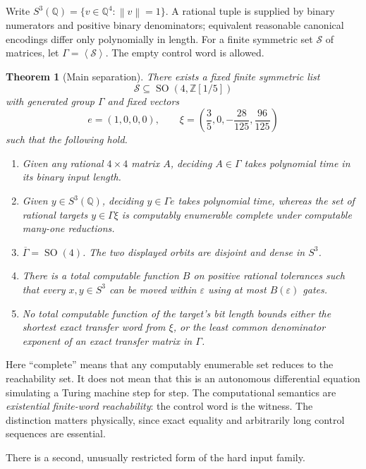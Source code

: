 \documentclass[11pt,letterpaper]{article}
\numberwithin{equation}{section}
\newtheorem{theorem}{Theorem}[section]
\theoremstyle{definition}
\theoremstyle{remark}
\newcommand{\Z}{\mathbb Z}
\newcommand{\Q}{\mathbb Q}
\newcommand{\eps}{\varepsilon}
\newcommand{\Sphere}{S^3}
\newcommand{\SO}{\operatorname{SO}}
\newcommand{\pair}[1]{\left\langle #1\right\rangle}
\newcommand{\enorm}[1]{\left\lVert#1\right\rVert}
\begin{document}
Write $\Sphere(\Q)=\{v\in\Q^4:\enorm v=1\}$. A rational tuple is supplied by
binary numerators and positive binary denominators; equivalent reasonable
canonical encodings differ only polynomially in length. For a finite
symmetric set $\mathcal S$ of matrices, let $\Gamma=\pair{\mathcal S}$.
The empty control word is allowed.

\begin{theorem}[Main separation]\label{pqc:rr:thm:main}
There exists a fixed finite symmetric list
\[
 \mathcal S\subseteq\SO(4,\Z[1/5])
\]
with generated group $\Gamma$ and fixed vectors
\begin{equation}\label{pqc:rr:eq:fixedstates}
 e=(1,0,0,0),\qquad
 \xi=\left(\frac35,0,-\frac{28}{125},\frac{96}{125}\right)
\end{equation}
such that the following hold.
\begin{enumerate}[label=(\roman*)]
\item Given any rational $4\times4$ matrix $A$, deciding $A\in\Gamma$
      takes polynomial time in its binary input length.
\item Given $y\in\Sphere(\Q)$, deciding $y\in\Gamma e$ takes polynomial
      time, whereas the set of rational targets $y\in\Gamma\xi$ is
      computably enumerable complete under computable many-one reductions.
\item $\overline\Gamma=\SO(4)$. The two displayed orbits are disjoint and
      dense in $\Sphere$.
\item There is a total computable function $B$ on positive rational
      tolerances such that every $x,y\in\Sphere$ can be moved within
      $\eps$ using at most $B(\eps)$ gates.
\item No total computable function of the target's bit length bounds either
      the shortest exact transfer word from $\xi$, or the least common
      denominator exponent of an exact transfer matrix in $\Gamma$.
\end{enumerate}
\end{theorem}

Here ``complete'' means that any computably enumerable set reduces to the
reachability set. It does not mean that this is an autonomous differential
equation simulating a Turing machine step for step. The computational
semantics are \emph{existential finite-word reachability}: the control word
is the witness. The distinction matters physically, since exact equality
and arbitrarily long control sequences are essential.

There is a second, unusually restricted form of the hard input family.
\end{document}
